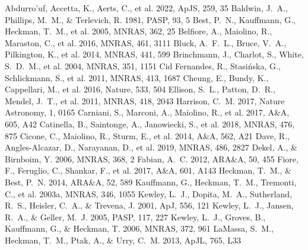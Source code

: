\documentclass[twocolumn]{aastex631}
\begin{document}
\begin{thebibliography}{}
 Abdurro'uf, Accetta, K., Aerts, C., et al. 2022, ApJS, 259, 35
 Baldwin, J.~A., Phillips, M.~M., \& Terlevich, R. 1981, PASP, 93, 5
 Best, P.~N., Kauffmann, G., Heckman, T.~M., et al. 2005, MNRAS, 362, 25
 Belfiore, A., Maiolino, R., Maraston, C., et al. 2016, MNRAS, 461, 3111
 Bluck, A.~F.~L., Bruce, V.~A., Pilkington, K., et al. 2014, MNRAS, 441, 599
 Brinchmann, J., Charlot, S., White, S.~D.~M., et al. 2004, MNRAS, 351, 1151
 Cid Fernandes, R., Stasi{\'n}ska, G., Schlickmann, S., et al. 2011, MNRAS, 413, 1687
 Cheung, E., Bundy, K., Cappellari, M., et al. 2016, Nature, 533, 504
 Ellison, S.~L., Patton, D.~R., Mendel, J.~T., et al. 2011, MNRAS, 418, 2043
 Harrison, C.~M. 2017, Nature Astronomy, 1, 0165
 Carniani, S., Marconi, A., Maiolino, R., et al. 2017, A\&A, 605, A42
 Catinella, B., Saintonge, A., Janowiecki, S., et al. 2018, MNRAS, 476, 875
 Cicone, C., Maiolino, R., Sturm, E., et al. 2014, A\&A, 562, A21
 Dave, R., Angles-Alcazar, D., Narayanan, D., et al. 2019, MNRAS, 486, 2827
 Dekel, A., \& Birnboim, Y. 2006, MNRAS, 368, 2
 Fabian, A.~C. 2012, ARA\&A, 50, 455
 Fiore, F., Feruglio, C., Shankar, F., et al. 2017, A\&A, 601, A143
 Heckman, T.~M., \& Best, P.~N. 2014, ARA\&A, 52, 589
 Kauffmann, G., Heckman, T.~M., Tremonti, C., et al. 2003a, MNRAS, 346, 1055
 Kewley, L.~J., Dopita, M.~A., Sutherland, R.~S., Heisler, C.~A., \& Trevena, J. 2001, ApJ, 556, 121
 Kewley, L.~J., Jansen, R.~A., \& Geller, M.~J. 2005, PASP, 117, 227
 Kewley, L.~J., Groves, B., Kauffmann, G., \& Heckman, T. 2006, MNRAS, 372, 961
 LaMassa, S.~M., Heckman, T.~M., Ptak, A., \& Urry, C.~M. 2013, ApJL, 765, L33

\end{thebibliography}
\end{document}
